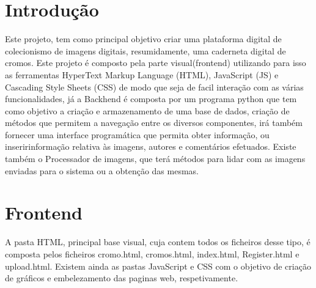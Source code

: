 \documentclass{report}
\begin{document}
\clearpage
{}

\chapter{Introdução}
\label{chapter1} 
Este projeto, tem como principal objetivo criar uma plataforma digital de colecionismo de imagens digitais, resumidamente, uma caderneta digital de cromos. Este projeto é composto pela parte visual(frontend) utilizando para isso as ferramentas  HyperText Markup Language (HTML), JavaScript (JS) e Cascading Style Sheets (CSS) de modo que seja de facil interação com as várias funcionalidades, já a Backhend é composta por um programa python que tem como objetivo a criação e armazenamento de uma base de dados, criação de métodos que permitem a navegação entre os diversos componentes, irá também fornecer uma interface programática que permita obter informação, ou inseririnformação relativa às imagens, autores e comentários efetuados. Existe também o Processador de imagens, que terá métodos para lidar com as imagens enviadas para o sistema ou a obtenção das mesmas.


\chapter{Frontend}
\label{chapter2}

A pasta HTML, principal base visual, cuja contem todos os ficheiros desse tipo, é composta pelos ficheiros cromo.html, cromos.html, index.html, Register.html e  upload.html. Existem ainda as pastas JavaScript e CSS com o objetivo de criação de gráficos e embelezamento das paginas web, respetivamente.

\renewcommand{\theenumi}{\Roman{enumi}} 
\end{document}
